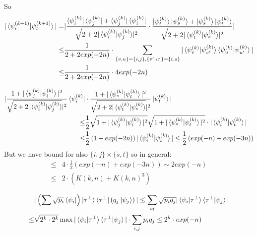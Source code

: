 \documentclass[manuscript,screen,review]{acmart}
\begin{document}
So
\begin{equation*}
  \begin{split}
    |\braket{\psi^{(k+1)}_{i}|\psi^{(k+1)}_{t}}| =& | \frac{
      \bra{\psi^{(k)}_{i}}\bra{\psi^{(k)}_{j}}+\bra{\psi^{(k)}_{j}}\bra{\psi^{(k)}_{i}}
    }{ \sqrt{2 + 2 |\braket{\psi^{(k)}_{i}|\psi^{(k)}_{j}}}|^2 } \cdot \frac{
      \ket{\psi^{(k)}_{t}}\ket{\psi^{(k)}_{s}}+\ket{\psi^{(k)}_{s}}\ket{\psi^{(k)}_{t}}
    }{ \sqrt{2 + 2 |\braket{\psi^{(k)}_{t}|\psi^{(k)}_{s}}}|^2 } | \\
    \le & \frac{1}{2+2exp(-2n)}\cdot \sum_{\{v,u\} =
    \{i,j\},\{v^{\prime},u^{\prime}\} = \{t,s\}}{
      |\braket{\psi^{(k)}_{v}|\psi^{(k)}_{v^{\prime}}}
    \braket{\psi^{(k)}_{u}|\psi^{(k)}_{u^{\prime}}}|} \\
    \le &\frac{1}{2+2exp(-2n)} \cdot 4 exp(-2n)
  \end{split}
\end{equation*}

\begin{equation*}
  \begin{split}
    |\frac{ 1 + |\braket{\psi^{(k)}_{j}|\psi^{(k)}_{i}}|^2 }{ \sqrt{2 + 2
    |\braket{\psi^{(k)}_{i}|\psi^{(k)}_{j}}}|^2 }\bra{\psi^{(k)}_{i}} & \cdot
    \frac{ 1 + |\braket{\psi^{(k)}_{s}|\psi^{(k)}_{t}}|^2 }{ \sqrt{2 + 2
    |\braket{\psi^{(k)}_{t}|\psi^{(k)}_{s}}}|^2 }\ket{\psi^{(k)}_{t}} | \\
    \le &\frac{1}{2} \sqrt{1 + |\braket{\psi^{(k)}_{j}|\psi^{(k)}_{i}}|^2}
    \sqrt{1 + |\braket{\psi^{(k)}_{s}|\psi^{(k)}_{t}}|^2}\cdot |
    \braket{\psi^{(k)}_{i}|\psi^{(k)}_{t}} | \\
    \le &
    \frac{1}{2}\left(1+exp(-2n)\right)|\braket{\psi^{(k)}_{i}|\psi^{(k)}_{t}} |
    \le \frac{1}{2}\left( exp(-n) + exp(-3n) \right)
  \end{split}
\end{equation*}
But we have bound for also $\{i,j\} \times \{s,t\}$ so in general:
\begin{equation*}
  \begin{split}
    \le & 4 \cdot  \frac{1}{2}\left( exp(-n) + exp(-3n) \right) \sim 2exp(-n)
    \\
    \le & 2 \cdot \left( K(k,n) + K(k,n)^{3} \right)
  \end{split}
\end{equation*}

\begin{equation*}
  \begin{split}
    & | \left(\sum \sqrt{p_{i}} \bra{\psi_{i}}
    \right)\ket{\tau^{\perp}}\bra{\tau^{\perp}} \left( q_{j} \ket{\psi_{j}}
    \right) | \le
    \sum_{ij}\sqrt{p_{i}q_{j}}|\braket{\psi_{i}|\tau^{\perp}}\braket{\tau^{\perp}|\psi_{j}}|
    \\
    \le & \sqrt{2^{k}\cdot 2^{k}} \max
    |\braket{\psi_{i}|\tau^{\perp}}\braket{\tau^{\perp}|\psi_{j}}| \cdot
    \sum_{i,j}p_{i}q_{j} \le 2^{k}\cdot exp(-n)
  \end{split}
\end{equation*}
\end{document}
